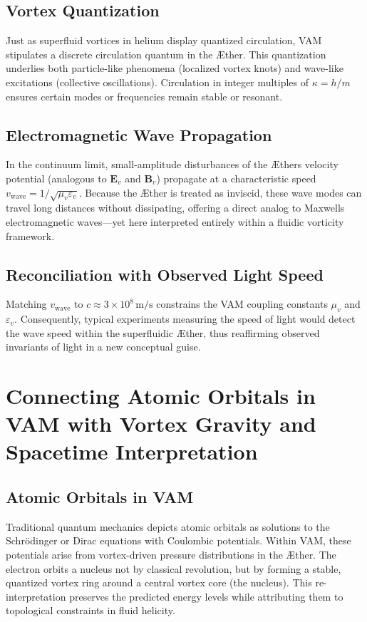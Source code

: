 \subsection{Vortex Quantization}
Just as superfluid vortices in helium display quantized circulation, VAM stipulates a discrete circulation quantum in the Æther. This quantization underlies both particle-like phenomena (localized vortex knots) and wave-like excitations (collective oscillations). Circulation in integer multiples of \( \kappa = h/m \) ensures certain modes or frequencies remain stable or resonant.

\subsection{Electromagnetic Wave Propagation}
In the continuum limit, small-amplitude disturbances of the Æther\rqs s velocity potential (analogous to \(\mathbf{E}_v\) and \(\mathbf{B}_v\)) propagate at a characteristic speed \(v_{\mathrm{wave}} = 1/\sqrt{\mu_v \varepsilon_v}\). Because the Æther is treated as inviscid, these wave modes can travel long distances without dissipating, offering a direct analog to Maxwell\rqs s electromagnetic waves—yet here interpreted entirely within a fluidic vorticity framework.

\subsection{Reconciliation with Observed Light Speed}
Matching \(v_{\mathrm{wave}}\) to \(c \approx 3\times 10^8\,\mathrm{m/s}\) constrains the VAM coupling constants \(\mu_v\) and \(\varepsilon_v\). Consequently, typical experiments measuring the speed of light would detect the wave speed within the superfluidic Æther, thus reaffirming observed invariants of light in a new conceptual guise.

\section{Connecting Atomic Orbitals in VAM with Vortex Gravity and Spacetime Interpretation}

\subsection{Atomic Orbitals in VAM}
Traditional quantum mechanics depicts atomic orbitals as solutions to the Schrödinger or Dirac equations with Coulombic potentials. Within VAM, these potentials arise from vortex-driven pressure distributions in the Æther. The electron orbits a nucleus not by classical revolution, but by forming a stable, quantized vortex ring around a central vortex core (the nucleus). This re-interpretation preserves the predicted energy levels while attributing them to topological constraints in fluid helicity.

